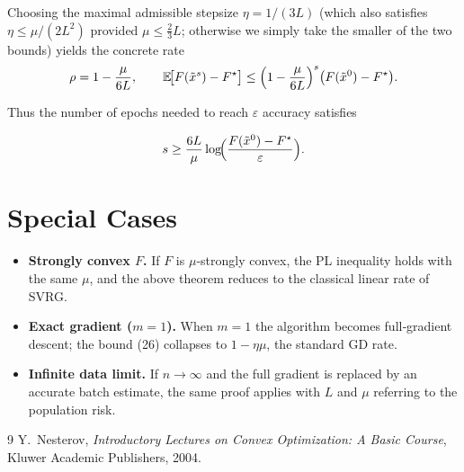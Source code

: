 \documentclass{article}
\newcommand{\E}{\mathbb{E}}
\begin{document}
Choosing the maximal admissible stepsize $\eta=1/(3L)$ (which also satisfies $\eta\le\mu/(2L^{2})$ provided $\mu\le \tfrac{2}{3}L$; otherwise we simply take the smaller of the two bounds) yields the concrete rate
\[
\rho = 1-\frac{\mu}{6L},\qquad
\E\!\bigl[F(\tilde{x}^{s})-F^{\star}\bigr]
\le \Bigl(1-\frac{\mu}{6L}\Bigr)^{s}
\bigl(F(\tilde{x}^{0})-F^{\star}\bigr).
\]

Thus the number of epochs needed to reach $\varepsilon$ accuracy satisfies  

\[
s\ge \frac{6L}{\mu}\log\!\Bigl(\frac{F(\tilde{x}^{0})-F^{\star}}{\varepsilon}\Bigr).
\]

\section*{Special Cases}
\begin{itemize}
\item \textbf{Strongly convex $F$.} If $F$ is $\mu$‑strongly convex, the PL inequality holds with the same $\mu$, and the above theorem reduces to the classical linear rate of SVRG.
\item \textbf{Exact gradient ($m=1$).} When $m=1$ the algorithm becomes full‑gradient descent; the bound (26) collapses to $1-\eta\mu$, the standard GD rate.
\item \textbf{Infinite data limit.} If $n\to\infty$ and the full gradient is replaced by an accurate batch estimate, the same proof applies with $L$ and $\mu$ referring to the population risk.
\end{itemize}

\begin{thebibliography}{9}
Y.~Nesterov, \emph{Introductory Lectures on Convex Optimization: A Basic Course}, Kluwer Academic Publishers, 2004.
\end{thebibliography}
\end{document}
